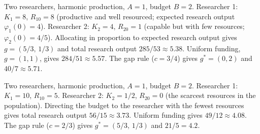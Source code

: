 \begin{example}\label{ex:track-record}
Two researchers, harmonic production, $A = 1$, budget $B = 2$. Researcher 1: $K_1 = 8$, $R_{10} = 8$ (productive and well resourced; expected research output $\varphi_1(0) = 4$). Researcher 2: $K_2 = 4$, $R_{20} = 1$ (capable but with few resources; $\varphi_2(0) = 4/5$). Allocating in proportion to expected research output gives $g = (5/3,\, 1/3)$ and total research output $285/53 \approx 5.38$. Uniform funding, $g = (1, 1)$, gives $284/51 \approx 5.57$. The gap rule ($c = 3/4$) gives $g^* = (0, 2)$ and $40/7 \approx 5.71$.
\end{example}

\begin{example}\label{ex:scarcity}
Two researchers, harmonic production, $A = 1$, budget $B = 2$. Researcher 1: $K_1 = 10$, $R_{10} = 5$. Researcher 2: $K_2 = 1/2$, $R_{20} = 0$ (the scarcest resources in the population). Directing the budget to the researcher with the fewest resources gives total research output $56/15 \approx 3.73$. Uniform funding gives $49/12 \approx 4.08$. The gap rule ($c = 2/3$) gives $g^* = (5/3,\, 1/3)$ and $21/5 = 4.2$.
\end{example}



